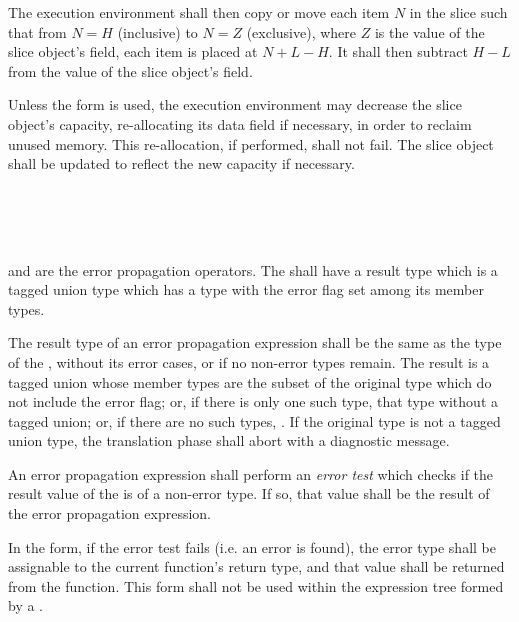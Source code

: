 \specsubsubitem
The execution environment shall then copy or move each item $N$ in the slice
such that from $N=H$ (inclusive) to $N=Z$ (exclusive), where $Z$ is the value of
the slice object's  field, each item is placed at $N+L-H$. It shall
then subtract $H-L$ from the value of the slice object's  field.

\specsubsubitem
Unless the  form is used, the execution environment may
decrease the slice object's capacity, re-allocating its data field if necessary,
in order to reclaim unused memory. This re-allocation, if performed, shall not
fail. The slice object shall be updated to reflect the new capacity if
necessary.


\begin{grammar}
 \\
	  \\
	 \terminal{!} \\
\end{grammar}

\specsubsubitem
{} and \terminal{!} are the error propagation operators. The
 shall have a result type which is
a tagged union type which has a type with the error flag set
among its member types.

\specsubsubitem
The result type of an error propagation expression shall be the same as the
type of the , without its error cases, or
 if no non-error types remain. The result is a tagged union
whose member types are the subset of the original type which do not include the
error flag; or, if there is only one such type, that type without a tagged
union; or, if there are no such types, . If the original type is
not a tagged union type, the translation phase shall abort with a diagnostic
message.

\specsubsubitem
An error propagation expression shall perform an \textit{error test} which
checks if the result value of the  is of a
non-error type. If so, that value shall be the result of the error propagation
expression.

\specsubsubitem
In the  form, if the error test fails (i.e. an error is found), the
error type shall be assignable to the current function's return type, and that
value shall be returned from the function. This form shall not be used within
the expression tree formed by a .

